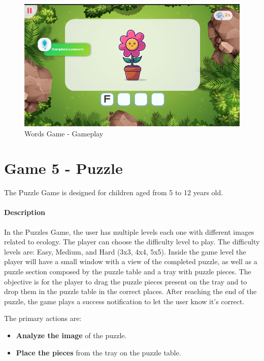 \begin{figure}[H]
    \centering
    \includegraphics[scale=0.45]{Chapters/gameplay/WordsGame.jpg}
    \caption{Words Game - Gameplay}
    \label{fig:wordsGameplay}    
\end{figure}

\newpage
\section{Game 5 - Puzzle}

The Puzzle Game is designed for children aged from 5 to 12 years old.

\paragraph{Description}

In the Puzzles Game, the user has multiple levels each one with different images related to ecology. The player can choose the difficulty level to play. The difficulty levels are: Easy, Medium, and Hard (3x3, 4x4, 5x5). Inside the game level the player will have a small window with a view of the completed puzzle, as well as a puzzle section composed by the puzzle table and a tray with puzzle pieces.
The objective is for the player to drag the puzzle pieces present on the tray and to drop them in the puzzle table in the correct places. After reaching the end of the puzzle, the game plays a success notification to let the user know it's correct.

The primary actions are:

\begin{itemize}
    \item \textbf{Analyze the image} of the puzzle.
    \item \textbf{Place the pieces} from the tray on the puzzle table.
\end{itemize}

